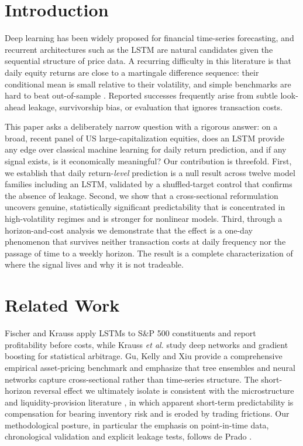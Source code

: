 \documentclass[conference]{IEEEtran}
\begin{document}
\section{Introduction}
Deep learning has been widely proposed for financial time-series forecasting, and
recurrent architectures such as the LSTM \cite{hochreiter1997} are natural
candidates given the sequential structure of price data. A recurring difficulty in
this literature is that daily equity returns are close to a martingale difference
sequence: their conditional mean is small relative to their volatility, and simple
benchmarks are hard to beat out-of-sample \cite{gu2020,depradombook}. Reported
successes frequently arise from subtle look-ahead leakage, survivorship bias, or
evaluation that ignores transaction costs.

This paper asks a deliberately narrow question with a rigorous answer: on a broad,
recent panel of US large-capitalization equities, does an LSTM provide any edge
over classical machine learning for daily return prediction, and if any signal
exists, is it economically meaningful? Our contribution is threefold. First, we
establish that daily return-\emph{level} prediction is a null result across twelve model families including an LSTM, validated by a shuffled-target control that
confirms the absence of leakage. Second, we show that a cross-sectional
reformulation uncovers genuine, statistically significant predictability that is
concentrated in high-volatility regimes and is stronger for nonlinear models.
Third, through a horizon-and-cost analysis we demonstrate that the effect is a
one-day phenomenon that survives neither transaction costs at daily frequency nor
the passage of time to a weekly horizon. The result is a complete characterization
of where the signal lives and why it is not tradeable.

\section{Related Work}
Fischer and Krauss \cite{fischer2018} apply LSTMs to S\&P 500 constituents and
report profitability before costs, while Krauss \emph{et al.} \cite{krauss2017}
study deep networks and gradient boosting for statistical arbitrage. Gu, Kelly and
Xiu \cite{gu2020} provide a comprehensive empirical asset-pricing benchmark and
emphasize that tree ensembles and neural networks capture cross-sectional rather
than time-series structure. The short-horizon reversal effect we ultimately
isolate is consistent with the microstructure and liquidity-provision literature
\cite{lo1990}, in which apparent short-term predictability is compensation for
bearing inventory risk and is eroded by trading frictions. Our methodological
posture, in particular the emphasis on point-in-time data, chronological
validation and explicit leakage tests, follows de Prado \cite{depradombook}.
\end{document}
